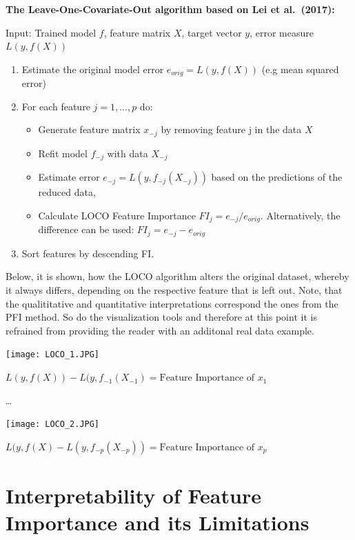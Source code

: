 \documentclass[
]{krantz}
\providecommand{\tightlist}{%
  \setlength{\itemsep}{0pt}\setlength{\parskip}{0pt}}
\begin{document}
\textbf{The Leave-One-Covariate-Out algorithm based on Lei et al.~(2017):}

Input: Trained model \(f\), feature matrix \(X\), target vector \(y\), error measure \(L(y,f(X))\)

\begin{enumerate}
\def\labelenumi{\arabic{enumi}.}
\tightlist
\item
  Estimate the original model error \(e_{orig} = L(y,f(X))\) (e.g mean squared error)
\item
  For each feature \(j = 1,...,p\) do:

  \begin{itemize}
  \tightlist
  \item
    Generate feature matrix \(x_{-j}\) by removing feature j in the data \(X\)
  \item
    Refit model \(f_{-j}\) with data \(X_{-j}\)
  \item
    Estimate error \(e_{-j} = L(y,f_{-j}(X_{-j}))\) based on the predictions of the reduced data,
  \item
    Calculate LOCO Feature Importance \(FI_{j} = e_{-j}/e_{orig}\). Alternatively, the difference can be used: \(FI_{j} = e_{-j} - e_{orig}\)
  \end{itemize}
\item
  Sort features by descending FI.
\end{enumerate}

Below, it is shown, how the LOCO algorithm alters the original dataset, whereby it always differs, depending on the respective feature that is left out. Note, that the qualititative and quantitative interpretations correspond the ones from the PFI method. So do the visualization tools and therefore at this point it is refrained from providing the reader with an additonal real data example.

\texttt{[image: LOCO\_1.JPG]}

\(L(y,f(X))- L(y,f_{-1}(X_{-1}) = \text{Feature Importance of }x_{1}\)

\ldots{}

\texttt{[image: LOCO\_2.JPG]}

\(L(y,f(X) - L(y,f_{-p}(X_{-p})) = \text{Feature Importance of } x_{p}\)

\hypertarget{interpretability-of-feature-importance-and-its-limitations}{%
\section{Interpretability of Feature Importance and its Limitations}\label{interpretability-of-feature-importance-and-its-limitations}}
\end{document}
